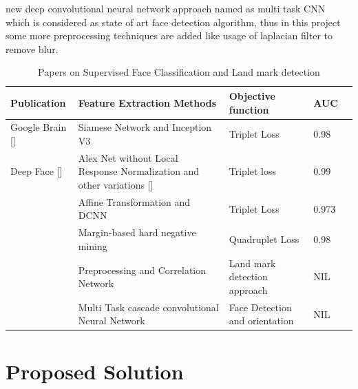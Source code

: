 \documentclass[a4paper,12pt, twoside]{NITKReport}
\begin{document}
new deep convolutional neural network approach named as multi task CNN which is considered as state of art face detection algorithm, thus in this project some more preprocessing techniques are added like usage of laplacian filter to remove blur.  

\begin{table}
  \centering
\begin{tabular}{ |p{3cm}|p{3cm}|p{2.5cm}|p{2cm}|p{2cm}|}
 \hline
 Publication & Feature Extraction Methods & Objective function & AUC\\
 \hline
 Google Brain [\cite{schroff2015facenet}] & Siamese Network and Inception V3 & Triplet Loss & 0.98\\
 \hline
 Deep Face [\cite{parkhi2015deep}] & Alex Net without Local Response Normalization and other variations [\cite{DBLP:journals/corr/SimonyanZ14a}] & Triplet loss & 0.99 \\
\hline
  [\cite{amos2016openface}] & Affine Transformation and DCNN & Triplet Loss & 0.973\\ 
 \hline
 [\cite{chen2017beyond}] & Margin-based hard negative mining & Quadruplet Loss & 0.98 \\
 \hline
 [\cite{zadeh2017convolutional}] & Preprocessing and Correlation Network & Land mark detection approach & NIL \\ 
 \hline
[\cite{zhang2016joint}] & Multi Task cascade convolutional Neural Network & Face Detection and orientation  & NIL \\
\hline
\end{tabular}
\caption{Papers on Supervised Face Classification and Land mark detection}\label{table:papers1}
\end{table}




\newpage
\chapter{Proposed Solution}
\label{chap3}
\label{solution}
\end{document}

